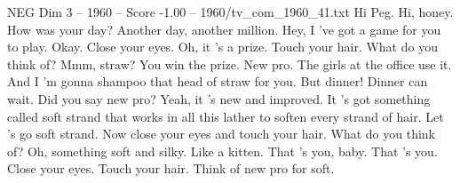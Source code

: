 \begin{textsample}{NEG Dim 3 – 1960 – Score -1.00 – 1960/tv\_com\_1960\_41.txt}  \label{ex:f3_neg_080}
Hi Peg.
Hi, honey.
How was your day?
Another day, another million.
Hey, I 've got a game for you to play.
Okay.
Close your eyes.
Oh, it 's a prize.
Touch your hair.
What do you think of?
Mmm, straw?
You win the prize.
New pro.
The girls at the office use it.
And I 'm gonna shampoo that head of straw for you.
But dinner!
Dinner can wait.
Did you say new pro?
Yeah, it 's new and improved.
It 's got something called soft strand that works in all this lather to soften every strand of hair.
Let 's go soft strand.
Now close your eyes and touch your hair.
What do you think of?
Oh, something soft and silky.
Like a kitten.
That 's you, baby.
That 's you.
Close your eyes.
Touch your hair.
Think of new pro for soft.

\end{textsample}
